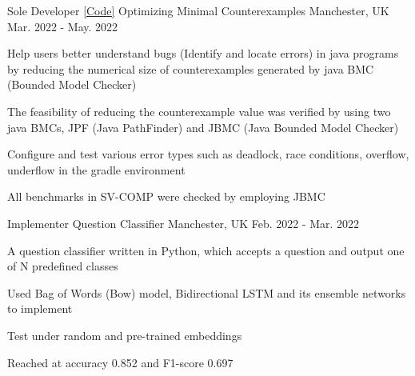 \begin{cventries}

  \cventry
    {Sole Developer \href{https://github.com/Zhayu517/Software-Security-Seminar}{[Code]}} %
    {Optimizing Minimal Counterexamples} %
    {Manchester, UK} %
    {Mar. 2022 - May. 2022} %
    {
      \begin{cvitems} %
        \item {Help users better understand bugs (Identify and locate errors) in java programs by reducing the numerical size of counterexamples generated by java BMC (Bounded Model Checker)}
        \item {The feasibility of reducing the counterexample value was verified by using two java BMCs, JPF (Java PathFinder) and JBMC (Java Bounded Model Checker)}
        \item {Configure and test various error types such as deadlock, race conditions, overflow, underflow in the gradle environment}
        \item {All benchmarks in SV-COMP were checked by employing JBMC}
      \end{cvitems}
    }

  \cventry
    {Implementer} %
    {Question Classifier} %
    {Manchester, UK} %
    {Feb. 2022 - Mar. 2022} %
    {
      \begin{cvitems} %
        \item {A question classifier written in Python, which accepts a question and output one of N            predefined classes}
        \item {Used Bag of Words (Bow) model, Bidirectional LSTM and its ensemble networks to implement}
        \item {Test under random and pre-trained embeddings}
        \item {Reached at accuracy 0.852 and F1-score 0.697}
      \end{cvitems}
    }


\end{cventries}
